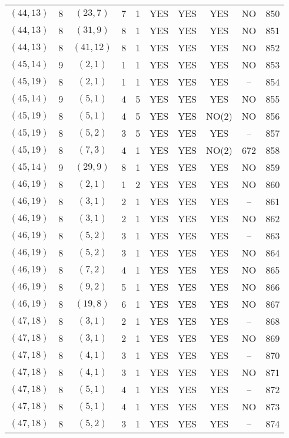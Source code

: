 \begin{longtable}{|c|c|c|c|c|c|c|c|c|c|}
$(44, 13)$ & 8 & $(23, 7)$ & 7 & 1 & YES & YES & YES & NO & 850\\
$(44, 13)$ & 8 & $(31, 9)$ & 8 & 1 & YES & YES & YES & NO & 851\\
$(44, 13)$ & 8 & $(41, 12)$ & 8 & 1 & YES & YES & YES & NO & 852\\
$(45, 14)$ & 9 & $(2, 1)$ & 1 & 1 & YES & YES & YES & NO & 853\\
$(45, 19)$ & 8 & $(2, 1)$ & 1 & 1 & YES & YES & YES & -- & 854\\
$(45, 14)$ & 9 & $(5, 1)$ & 4 & 5 & YES & YES & YES & NO & 855\\
$(45, 19)$ & 8 & $(5, 1)$ & 4 & 5 & YES & YES & NO(2) & NO & 856\\
$(45, 19)$ & 8 & $(5, 2)$ & 3 & 5 & YES & YES & YES & -- & 857\\
$(45, 19)$ & 8 & $(7, 3)$ & 4 & 1 & YES & YES & NO(2) & 672 & 858\\
$(45, 14)$ & 9 & $(29, 9)$ & 8 & 1 & YES & YES & YES & NO & 859\\
$(46, 19)$ & 8 & $(2, 1)$ & 1 & 2 & YES & YES & YES & NO & 860\\
$(46, 19)$ & 8 & $(3, 1)$ & 2 & 1 & YES & YES & YES & -- & 861\\
$(46, 19)$ & 8 & $(3, 1)$ & 2 & 1 & YES & YES & YES & NO & 862\\
$(46, 19)$ & 8 & $(5, 2)$ & 3 & 1 & YES & YES & YES & -- & 863\\
$(46, 19)$ & 8 & $(5, 2)$ & 3 & 1 & YES & YES & YES & NO & 864\\
$(46, 19)$ & 8 & $(7, 2)$ & 4 & 1 & YES & YES & YES & NO & 865\\
$(46, 19)$ & 8 & $(9, 2)$ & 5 & 1 & YES & YES & YES & NO & 866\\
$(46, 19)$ & 8 & $(19, 8)$ & 6 & 1 & YES & YES & YES & NO & 867\\
$(47, 18)$ & 8 & $(3, 1)$ & 2 & 1 & YES & YES & YES & -- & 868\\
$(47, 18)$ & 8 & $(3, 1)$ & 2 & 1 & YES & YES & YES & NO & 869\\
$(47, 18)$ & 8 & $(4, 1)$ & 3 & 1 & YES & YES & YES & -- & 870\\
$(47, 18)$ & 8 & $(4, 1)$ & 3 & 1 & YES & YES & YES & NO & 871\\
$(47, 18)$ & 8 & $(5, 1)$ & 4 & 1 & YES & YES & YES & -- & 872\\
$(47, 18)$ & 8 & $(5, 1)$ & 4 & 1 & YES & YES & YES & NO & 873\\
$(47, 18)$ & 8 & $(5, 2)$ & 3 & 1 & YES & YES & YES & -- & 874\\

\end{longtable}
